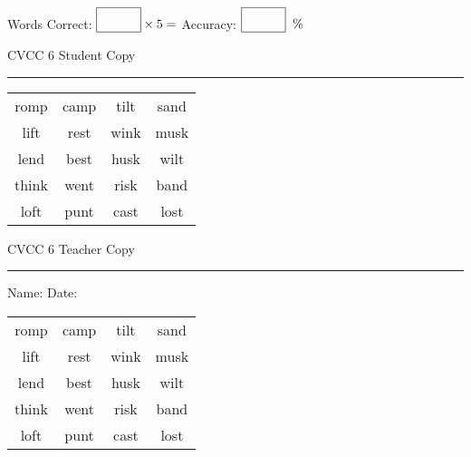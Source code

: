 \documentclass{memoir}
\begin{document}
\small

Words Correct: $\fbox{\phantom{\huge 100}} \times 5 = $ Accuracy: $\fbox{\phantom{\huge 100}}\;\; \%$ 

\vfill

\newpage


\footnotesize \noindent
CVCC 6 \hfill Student Copy
\smallskip
\hrule

\Large

\setlength{\tabcolsep}{14pt}
\def\arraystretch{3}

{\selectfont


\begin{vplace}[0.5]
\begin{center}
\begin{tabular}{cccc}
romp & camp & tilt & sand \\
lift & rest & wink & musk \\
lend & best  & husk & wilt \\
think & went & risk & band \\
loft & punt & cast & lost \\
\end{tabular}
\end{center}
\end{vplace}

}

\newpage

\footnotesize \noindent
CVCC 6 \hfill Teacher Copy
\smallskip
\hrule

\small

\vfill

\noindent
Name: \underline{\hspace{1.75in}} \hfill Date: \underline{\hspace{1in}}

\Large

{\selectfont


\begin{vplace}[0.5]
\begin{center}
\begin{tabular}{cccc}
romp & camp & tilt & sand \\
lift & rest & wink & musk \\
lend & best  & husk & wilt \\
think & went & risk & band \\
loft & punt & cast & lost \\
\end{tabular}
\end{center}
\end{vplace}



}
\end{document}
